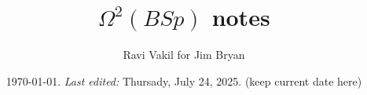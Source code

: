 \newcommand{\aff}{\rm{aff}}

\newcommand{\Gr}{\rm{Gr}}
\newcommand{\LGr}{\rm{LGr}}
\newcommand{\SAG}{\rm{SpAfGr}}
\newcommand{\LSG}{\rm{LgStGr}}

\newcommand{\jalpha}{\mathord{j\mkern-7mu\alpha}}
\newcommand{\vjalpha}{\vec{\jalpha}}

\newcommand{\Id}{\rm{Id}}



\newcommand{\remind}[1]{{\bf[{\large TODO:  } #1]}}
\newcommand{\lremind}[1]{{\bf[label:  #1]}}
\newcommand{\notation}[1]{}
\renewcommand{\lremind}[1]{{}}

\newcommand{\ravi}[1]{{\bf [#1 --- Ravi]}}
\newcommand{\hidden}[1]{\footnote{Hidden:  #1}}

\newcommand{\cut}[1]{}


\newcommand{\leftbox}[1]{      \begin{flushleft}\fbox{ \parbox{25em}{
#1        }}\end{flushleft}
}\newcommand{\centerbox}[1]{      \begin{center}\fbox{ \parbox{25em}{
#1        }}\end{center}
}
\newcommand{\rightbox}[1]{      \begin{flushright}\fbox{ \parbox{25em}{
#1        }}\end{flushright}
}



\pagestyle{plain}
\title{\Large{$\Omega^2(BSp)$ notes}}
\author{Ravi Vakil for Jim Bryan}
\date{\today .   {\em Last edited:}
 Thursady, July 24, 2025. (keep current date here)  }
\maketitle
\tableofcontents


